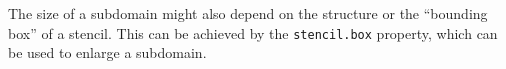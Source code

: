 The size of a subdomain might also depend on the structure or the ``bounding box'' of a stencil.
This can be achieved by the \texttt{stencil.box} property, which can be used to enlarge a subdomain.

